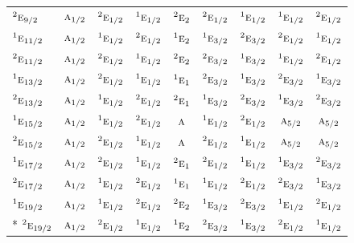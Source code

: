 \documentclass[10pt,a4paper]{article}
\numberwithin{equation}{section}
\newcommand{\irr}[1]{\text{\normalfont\scshape #1}}
\newcommand{\conjpair}[1]{{}^{#1}}
\begin{document}
{\begin{longtable}{@{}lcccccccc@{}}
$\conjpair{2}\irr{e}_{9/2}$ & $\irr{a}_{1/2}$ & $\conjpair{2}\irr{e}_{1/2}$ & $\conjpair{1}\irr{e}_{1/2}$ & $\conjpair{2}\irr{e}_{2}$ & $\conjpair{2}\irr{e}_{1/2}$ & $\conjpair{1}\irr{e}_{1/2}$ & $\conjpair{1}\irr{e}_{1/2}$ & $\conjpair{2}\irr{e}_{1/2}$\\
$\conjpair{1}\irr{e}_{11/2}$ & $\irr{a}_{1/2}$ & $\conjpair{1}\irr{e}_{1/2}$ & $\conjpair{2}\irr{e}_{1/2}$ & $\conjpair{1}\irr{e}_{2}$ & $\conjpair{1}\irr{e}_{3/2}$ & $\conjpair{2}\irr{e}_{3/2}$ & $\conjpair{2}\irr{e}_{1/2}$ & $\conjpair{1}\irr{e}_{1/2}$\\
$\conjpair{2}\irr{e}_{11/2}$ & $\irr{a}_{1/2}$ & $\conjpair{2}\irr{e}_{1/2}$ & $\conjpair{1}\irr{e}_{1/2}$ & $\conjpair{2}\irr{e}_{2}$ & $\conjpair{2}\irr{e}_{3/2}$ & $\conjpair{1}\irr{e}_{3/2}$ & $\conjpair{1}\irr{e}_{1/2}$ & $\conjpair{2}\irr{e}_{1/2}$\\
$\conjpair{1}\irr{e}_{13/2}$ & $\irr{a}_{1/2}$ & $\conjpair{2}\irr{e}_{1/2}$ & $\conjpair{1}\irr{e}_{1/2}$ & $\conjpair{1}\irr{e}_{1}$ & $\conjpair{2}\irr{e}_{3/2}$ & $\conjpair{1}\irr{e}_{3/2}$ & $\conjpair{2}\irr{e}_{3/2}$ & $\conjpair{1}\irr{e}_{3/2}$\\
$\conjpair{2}\irr{e}_{13/2}$ & $\irr{a}_{1/2}$ & $\conjpair{1}\irr{e}_{1/2}$ & $\conjpair{2}\irr{e}_{1/2}$ & $\conjpair{2}\irr{e}_{1}$ & $\conjpair{1}\irr{e}_{3/2}$ & $\conjpair{2}\irr{e}_{3/2}$ & $\conjpair{1}\irr{e}_{3/2}$ & $\conjpair{2}\irr{e}_{3/2}$\\
$\conjpair{1}\irr{e}_{15/2}$ & $\irr{a}_{1/2}$ & $\conjpair{1}\irr{e}_{1/2}$ & $\conjpair{2}\irr{e}_{1/2}$ & $\irr{a}$ & $\conjpair{1}\irr{e}_{1/2}$ & $\conjpair{2}\irr{e}_{1/2}$ & $\irr{a}_{5/2}$ & $\irr{a}_{5/2}$\\
$\conjpair{2}\irr{e}_{15/2}$ & $\irr{a}_{1/2}$ & $\conjpair{2}\irr{e}_{1/2}$ & $\conjpair{1}\irr{e}_{1/2}$ & $\irr{a}$ & $\conjpair{2}\irr{e}_{1/2}$ & $\conjpair{1}\irr{e}_{1/2}$ & $\irr{a}_{5/2}$ & $\irr{a}_{5/2}$\\
$\conjpair{1}\irr{e}_{17/2}$ & $\irr{a}_{1/2}$ & $\conjpair{2}\irr{e}_{1/2}$ & $\conjpair{1}\irr{e}_{1/2}$ & $\conjpair{2}\irr{e}_{1}$ & $\conjpair{2}\irr{e}_{1/2}$ & $\conjpair{1}\irr{e}_{1/2}$ & $\conjpair{1}\irr{e}_{3/2}$ & $\conjpair{2}\irr{e}_{3/2}$\\
$\conjpair{2}\irr{e}_{17/2}$ & $\irr{a}_{1/2}$ & $\conjpair{1}\irr{e}_{1/2}$ & $\conjpair{2}\irr{e}_{1/2}$ & $\conjpair{1}\irr{e}_{1}$ & $\conjpair{1}\irr{e}_{1/2}$ & $\conjpair{2}\irr{e}_{1/2}$ & $\conjpair{2}\irr{e}_{3/2}$ & $\conjpair{1}\irr{e}_{3/2}$\\
$\conjpair{1}\irr{e}_{19/2}$ & $\irr{a}_{1/2}$ & $\conjpair{1}\irr{e}_{1/2}$ & $\conjpair{2}\irr{e}_{1/2}$ & $\conjpair{2}\irr{e}_{2}$ & $\conjpair{1}\irr{e}_{3/2}$ & $\conjpair{2}\irr{e}_{3/2}$ & $\conjpair{1}\irr{e}_{1/2}$ & $\conjpair{2}\irr{e}_{1/2}$\\*
$\conjpair{2}\irr{e}_{19/2}$ & $\irr{a}_{1/2}$ & $\conjpair{2}\irr{e}_{1/2}$ & $\conjpair{1}\irr{e}_{1/2}$ & $\conjpair{1}\irr{e}_{2}$ & $\conjpair{2}\irr{e}_{3/2}$ & $\conjpair{1}\irr{e}_{3/2}$ & $\conjpair{2}\irr{e}_{1/2}$ & $\conjpair{1}\irr{e}_{1/2}$\\
\bottomrule\end{longtable}}
\end{document}
